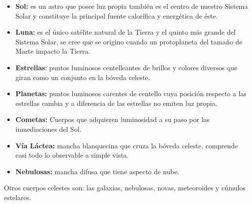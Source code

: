 \documentclass[10pt,a4paper]{article}
\begin{document}
\begin{itemize}
\item \textbf{Sol:} es un astro que posee luz propia también es el centro de nuestro Sistema Solar y constituye la principal fuente calorífica y energética de éste.
\item \textbf{Luna:} es el único satélite natural de la Tierra y el quinto más grande del Sistema Solar, se cree que se origino cuando un protoplaneta del tamaño de Marte impacto la Tierra.
\item \textbf{Estrellas}: puntos luminosos centelleantes de brillos y colores diversos que giran como un conjunto en la bóveda celeste.
\item \textbf{Planetas:} puntos luminosos carentes de centello cuya posición respecto a las estrellas cambia y a diferencia de las estrellas no emiten luz propia. 
\item \textbf{Cometas:} Cuerpos que adquieren luminosidad a su paso por las inmediaciones del Sol. 
\item \textbf{Vía Láctea:} mancha blanquecina que cruza la bóveda celeste, comprende casi todo lo observable a simple vista.
\item \textbf{Nebulosas:} mancha difusa que tiene aspecto de nube. 
\end{itemize}

Otros cuerpos celestes son: las galaxias, nebulosas, novas, meteoroides y cúmulos estelares.
\end{document}
